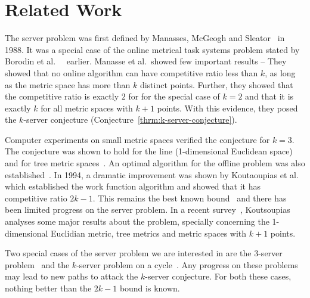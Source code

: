 \section{Related Work}\label{sec:related-work}

The server problem was first defined by Manasses, McGeogh and Sleator~\cite{MMS88} in 1988. It was a special case of the online metrical task systems problem stated by Borodin et al.\ ~\cite{BLS87, BLS92} earlier. Manasse et al.\ showed few important results -- They showed that no online algorithm can have competitive ratio less than $k$, as long as the metric space has more than $k$ distinct points. Further, they showed that the competitive ratio is exactly $2$ for for the special case of $k=2$ and that it is exactly $k$ for all metric spaces with $k+1$ points. With this evidence, they posed the $k$-server conjecture (Conjecture~\ref{thrm:k-server-conjecture}).

Computer experiments on small metric spaces verified the conjecture for $k=3$. The conjecture was shown to hold for the line (1-dimensional Euclidean space)~\cite{CKPV91} and for tree metric spaces~\cite{CL91}. An optimal algorithm for the offline problem was also established~\cite{CKPV91}. In 1994, a dramatic improvement was shown by Koutaoupias et al.~\cite{KP94} which established the work function algorithm and showed that it has competitive ratio $2k-1$. This remains the best known bound~\cite{Kou09} and there has been limited progress on the server problem. In a recent survey~\cite{Kou09}, Koutsoupias analyses some major results about the problem, specially concerning the 1-dimensional Euclidian metric, tree metrics and metric spaces with $k+1$ points.

Two special cases of the server problem we are interested in are the $3$-server problem~\cite{CL94, BCL02} and the $k$-server problem on a cycle~\cite{FRRS91}. Any progress on these problems may lead to new paths to attack the $k$-server conjecture. For both these cases, nothing better than the $2k-1$ bound is known.